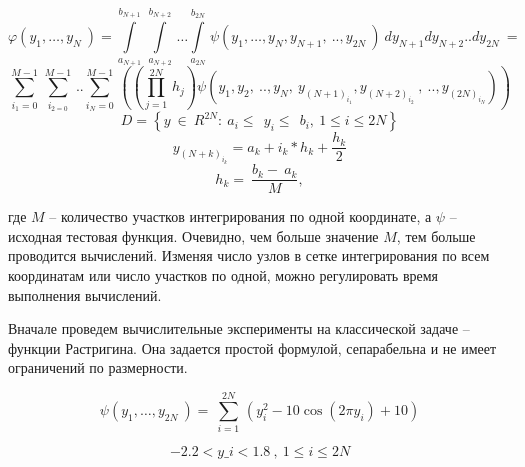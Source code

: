 \documentclass[10pt,a4paper]{book}
\begin{document}
\begin{equation}
\varphi \left( {{y}_{1}},\ldots ,{{y}_{N}}~ \right)=\underset{{{a}_{N+1}}}{\overset{{{b}_{N+1}}}{\mathop \int }}\,\underset{{{a}_{N+2}}}{\overset{{{b}_{N+2}}}{\mathop \int }}\,\ldots \underset{{{a}_{2N}}}{\overset{{{b}_{2N}}}{\mathop \int }}\,\psi \left( {{y}_{1}},\ldots ,{{y}_{N}},{{y}_{N+1}},~..,{{y}_{2N}}~ \right)~d{{y}_{N+1}}d{{y}_{N+2}}..d{{y}_{2N}}~= 
\end{equation}
\begin{displaymath}
\underset{{{i}_{1}}=0}{\overset{M-1}{\mathop \sum }}\,\underset{{{i}_{2=0}}}{\overset{M-1}{\mathop \sum }}\,..\underset{{{i}_{N}}=0}{\overset{M-1}{\mathop \sum }}\,\left( \left( \underset{j=1}{\overset{2N}{\mathop \prod }}\,{{h}_{j}} \right)\psi \left( {{y}_{1}},{{y}_{2}},~..,{{y}_{N}},~{{y}_{{{\left( N+1 \right)}_{{{i}_{1}}}}}},{{y}_{{{\left( N+2 \right)}_{{{i}_{2}}}}}}~,~..,{{y}_{{{\left( 2N \right)}_{{{i}_{N}}}}}} \right) \right)
\end{displaymath}
\begin{displaymath}
D=\left\{ y~\in ~{{R}^{2N}}:~{{a}_{i}}\le ~~{{y}_{i}}\le ~~{{b}_{i}},~1\le i\le 2N \right\}
\end{displaymath}
\begin{equation}
{{y}_{{{\left( N+k \right)}_{{{i}_{k}}}}}}={{a}_{k}}+{{i}_{k}}*{{h}_{k}}+\frac{{{h}_{k}}}{2}
\end{equation}
\begin{equation}
{{h}_{k}}=~\frac{{{b}_{k}}-~{{a}_{k}}}{M},
\end{equation}


	
где $M$ -- количество участков интегрирования по одной координате, а $\psi$ – исходная тестовая функция. Очевидно, чем больше значение $M$, тем больше проводится вычислений. Изменяя число узлов в сетке интегрирования по всем координатам или число участков по одной, можно регулировать время выполнения вычислений.


Вначале проведем вычислительные эксперименты на классической задаче – функции Растригина. Она задается простой формулой, сепарабельна и не имеет ограничений по размерности. 


\begin{equation}
\label{Rastrigin}
\psi \left( {{y}_{1}},\ldots ,{{y}_{2N}}~ \right)=~\underset{i=1}{\overset{2N}{\mathop \sum }}\,(y_{i}^{2}-10\cos \left( 2\pi {{y}_{i}} \right)+10)
\end{equation}

\begin{displaymath}
-2.2<y\_i<1.8~,~1\le i\le 2N
\end{displaymath}
\end{document}

